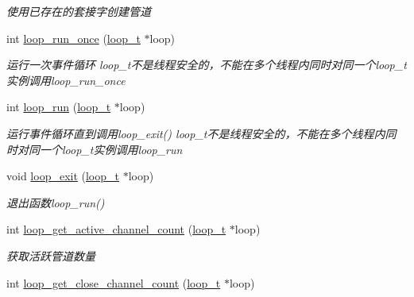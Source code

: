 \begin{DoxyCompactItemize}
\begin{DoxyCompactList}\small\item\em 使用已存在的套接字创建管道 \end{DoxyCompactList}\item 
int \hyperlink{a00105_ga2f1994d76e46cf4855ac955ccd41d9ef_ga2f1994d76e46cf4855ac955ccd41d9ef}{loop\+\_\+run\+\_\+once} (\hyperlink{a00051_a9c3ad1cd2de83e09f3a7b59fa82c94ee_a9c3ad1cd2de83e09f3a7b59fa82c94ee}{loop\+\_\+t} $\ast$loop)
\begin{DoxyCompactList}\small\item\em 运行一次事件循环 loop\+\_\+t不是线程安全的，不能在多个线程内同时对同一个loop\+\_\+t实例调用loop\+\_\+run\+\_\+once \end{DoxyCompactList}\item 
int \hyperlink{a00105_ga8eb0f6c8d398c70fc5ca2292664a1187_ga8eb0f6c8d398c70fc5ca2292664a1187}{loop\+\_\+run} (\hyperlink{a00051_a9c3ad1cd2de83e09f3a7b59fa82c94ee_a9c3ad1cd2de83e09f3a7b59fa82c94ee}{loop\+\_\+t} $\ast$loop)
\begin{DoxyCompactList}\small\item\em 运行事件循环直到调用loop\+\_\+exit() loop\+\_\+t不是线程安全的，不能在多个线程内同时对同一个loop\+\_\+t实例调用loop\+\_\+run \end{DoxyCompactList}\item 
void \hyperlink{a00105_ga898c7e8ef4ff2f360a32454b2b1013de_ga898c7e8ef4ff2f360a32454b2b1013de}{loop\+\_\+exit} (\hyperlink{a00051_a9c3ad1cd2de83e09f3a7b59fa82c94ee_a9c3ad1cd2de83e09f3a7b59fa82c94ee}{loop\+\_\+t} $\ast$loop)
\begin{DoxyCompactList}\small\item\em 退出函数loop\+\_\+run() \end{DoxyCompactList}\item 
int \hyperlink{a00105_ga6fa8f99fdc7a036fea6ca91971885e52_ga6fa8f99fdc7a036fea6ca91971885e52}{loop\+\_\+get\+\_\+active\+\_\+channel\+\_\+count} (\hyperlink{a00051_a9c3ad1cd2de83e09f3a7b59fa82c94ee_a9c3ad1cd2de83e09f3a7b59fa82c94ee}{loop\+\_\+t} $\ast$loop)
\begin{DoxyCompactList}\small\item\em 获取活跃管道数量 \end{DoxyCompactList}\item 
int \hyperlink{a00105_ga604184ddcd3e06bc7bfd4f1722778029_ga604184ddcd3e06bc7bfd4f1722778029}{loop\+\_\+get\+\_\+close\+\_\+channel\+\_\+count} (\hyperlink{a00051_a9c3ad1cd2de83e09f3a7b59fa82c94ee_a9c3ad1cd2de83e09f3a7b59fa82c94ee}{loop\+\_\+t} $\ast$loop)

\end{DoxyCompactItemize}
